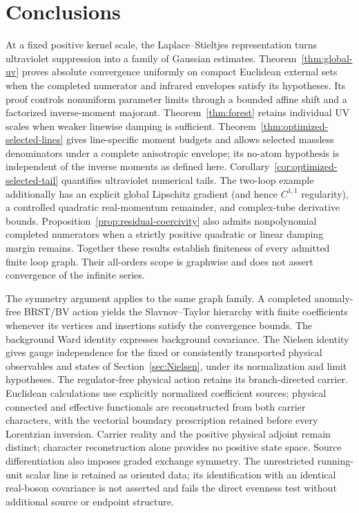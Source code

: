 \documentclass[final,5p,times,twocolumn,numbers,nopreprintline]{elsarticle}
\numberwithin{equation}{section}
\theoremstyle{definition}
\theoremstyle{remark}
\begin{document}
\section{Conclusions}
\label{sec:conclusions}

At a fixed positive kernel scale, the Laplace--Stieltjes representation
turns ultraviolet suppression into a family of Gaussian estimates.
Theorem~\ref{thm:global-uv} proves absolute convergence uniformly on
compact Euclidean external sets when the completed numerator and
infrared envelopes satisfy its hypotheses. Its proof controls
nonuniform parameter limits through a bounded affine shift and a
factorized inverse-moment majorant. Theorem~\ref{thm:forest} retains
individual UV scales when weaker linewise damping is sufficient.
Theorem~\ref{thm:optimized-selected-lines} gives line-specific
moment budgets and allows selected massless denominators under a
complete anisotropic envelope; its no-atom hypothesis is independent
of the inverse moments as defined here. Corollary~\ref{cor:optimized-selected-tail}
quantifies ultraviolet numerical tails. The two-loop example additionally
has an explicit global Lipschitz gradient (and hence $C^{1,1}$
regularity), a controlled quadratic real-momentum remainder,
and complex-tube derivative bounds.
Proposition~\ref{prop:residual-coercivity} also admits nonpolynomial
completed numerators when a strictly positive quadratic or linear
damping margin remains. Together these results establish finiteness
of every admitted finite loop graph. Their all-orders scope is
graphwise and does not assert convergence of the infinite series.

The symmetry argument applies to the same graph family. A completed
anomaly-free BRST/BV action yields the Slavnov--Taylor hierarchy with
finite coefficients whenever its vertices and insertions satisfy the
convergence bounds. The background Ward identity expresses background
covariance. The Nielsen identity gives gauge independence for the
fixed or consistently transported physical observables and states of
Section~\ref{sec:Nielsen}, under its normalization and limit hypotheses.
The regulator-free physical action retains its branch-directed
carrier. Euclidean calculations use explicitly normalized
coefficient sources; physical connected and effective functionals
are reconstructed from both carrier characters, with the vectorial
boundary prescription retained before every Lorentzian inversion.
Carrier reality and the positive physical adjoint remain distinct;
character reconstruction alone provides no positive state space.
Source differentiation also imposes graded exchange symmetry. The
unrestricted running-unit scalar line is retained as oriented data;
its identification with an identical real-boson covariance is not
asserted and fails the direct evenness test without additional source
or endpoint structure.
\end{document}
